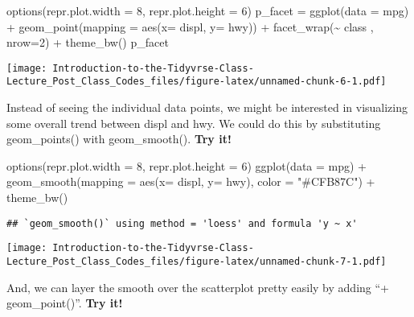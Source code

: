 \documentclass[
]{article}
\newenvironment{Shaded}{\begin{snugshade}}{\end{snugshade}}
\newcommand{\AttributeTok}[1]{\textcolor[rgb]{0.77,0.63,0.00}{#1}}
\newcommand{\DecValTok}[1]{\textcolor[rgb]{0.00,0.00,0.81}{#1}}
\newcommand{\FunctionTok}[1]{\textcolor[rgb]{0.00,0.00,0.00}{#1}}
\newcommand{\NormalTok}[1]{#1}
\newcommand{\OtherTok}[1]{\textcolor[rgb]{0.56,0.35,0.01}{#1}}
\newcommand{\SpecialCharTok}[1]{\textcolor[rgb]{0.00,0.00,0.00}{#1}}
\newcommand{\StringTok}[1]{\textcolor[rgb]{0.31,0.60,0.02}{#1}}
\begin{document}
\begin{Shaded}
\begin{Highlighting}[]
\FunctionTok{options}\NormalTok{(}\AttributeTok{repr.plot.width =} \DecValTok{8}\NormalTok{, }\AttributeTok{repr.plot.height =} \DecValTok{6}\NormalTok{)}
\NormalTok{p\_facet }\OtherTok{=} \FunctionTok{ggplot}\NormalTok{(}\AttributeTok{data =}\NormalTok{ mpg) }\SpecialCharTok{+} 
  \FunctionTok{geom\_point}\NormalTok{(}\AttributeTok{mapping =} \FunctionTok{aes}\NormalTok{(}\AttributeTok{x=}\NormalTok{ displ, }\AttributeTok{y=}\NormalTok{ hwy)) }\SpecialCharTok{+} 
  \FunctionTok{facet\_wrap}\NormalTok{(}\SpecialCharTok{\textasciitilde{}}\NormalTok{ class , }\AttributeTok{nrow=}\DecValTok{2}\NormalTok{) }\SpecialCharTok{+} 
  \FunctionTok{theme\_bw}\NormalTok{()}
\NormalTok{p\_facet}
\end{Highlighting}
\end{Shaded}

\texttt{[image: Introduction-to-the-Tidyvrse-Class-Lecture\_Post\_Class\_Codes\_files/figure-latex/unnamed-chunk-6-1.pdf]}

Instead of seeing the individual data points, we might be interested in
visualizing some overall trend between displ and hwy. We could do this
by substituting geom\_points() with geom\_smooth(). \textbf{Try it!}

\begin{Shaded}
\begin{Highlighting}[]
\FunctionTok{options}\NormalTok{(}\AttributeTok{repr.plot.width =} \DecValTok{8}\NormalTok{, }\AttributeTok{repr.plot.height =} \DecValTok{6}\NormalTok{)}
\FunctionTok{ggplot}\NormalTok{(}\AttributeTok{data =}\NormalTok{ mpg) }\SpecialCharTok{+} 
  \FunctionTok{geom\_smooth}\NormalTok{(}\AttributeTok{mapping =} \FunctionTok{aes}\NormalTok{(}\AttributeTok{x=}\NormalTok{ displ, }\AttributeTok{y=}\NormalTok{ hwy), }\AttributeTok{color =} \StringTok{"\#CFB87C"}\NormalTok{) }\SpecialCharTok{+}
  \FunctionTok{theme\_bw}\NormalTok{()}
\end{Highlighting}
\end{Shaded}

\begin{verbatim}
## `geom_smooth()` using method = 'loess' and formula 'y ~ x'
\end{verbatim}

\texttt{[image: Introduction-to-the-Tidyvrse-Class-Lecture\_Post\_Class\_Codes\_files/figure-latex/unnamed-chunk-7-1.pdf]}

And, we can layer the smooth over the scatterplot pretty easily by
adding ``+ geom\_point()''. \textbf{Try it!}
\end{document}
